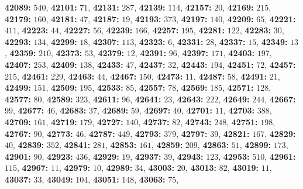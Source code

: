 \textsf{\bfseries 42089:} $540$, \textsf{\bfseries 42101:} $71$, \textsf{\bfseries 42131:} $287$, \textsf{\bfseries 42139:} $114$, \textsf{\bfseries 42157:} $20$, \textsf{\bfseries 42169:} $215$, \textsf{\bfseries 42179:} $160$, \textsf{\bfseries 42181:} $47$, \textsf{\bfseries 42187:} $19$, \textsf{\bfseries 42193:} $373$, \textsf{\bfseries 42197:} $140$, \textsf{\bfseries 42209:} $65$, \textsf{\bfseries 42221:} $411$, \textsf{\bfseries 42223:} $44$, \textsf{\bfseries 42227:} $56$, \textsf{\bfseries 42239:} $166$, \textsf{\bfseries 42257:} $195$, \textsf{\bfseries 42281:} $122$, \textsf{\bfseries 42283:} $30$, \textsf{\bfseries 42293:} $134$, \textsf{\bfseries 42299:} $18$, \textsf{\bfseries 42307:} $113$, \textsf{\bfseries 42323:} $6$, \textsf{\bfseries 42331:} $28$, \textsf{\bfseries 42337:} $15$, \textsf{\bfseries 42349:} $13$, \textsf{\bfseries 42359:} $210$, \textsf{\bfseries 42373:} $53$, \textsf{\bfseries 42379:} $12$, \textsf{\bfseries 42391:} $96$, \textsf{\bfseries 42397:} $171$, \textsf{\bfseries 42403:} $197$, \textsf{\bfseries 42407:} $253$, \textsf{\bfseries 42409:} $138$, \textsf{\bfseries 42433:} $47$, \textsf{\bfseries 42437:} $32$, \textsf{\bfseries 42443:} $194$, \textsf{\bfseries 42451:} $72$, \textsf{\bfseries 42457:} $215$, \textsf{\bfseries 42461:} $229$, \textsf{\bfseries 42463:} $44$, \textsf{\bfseries 42467:} $150$, \textsf{\bfseries 42473:} $11$, \textsf{\bfseries 42487:} $58$, \textsf{\bfseries 42491:} $21$, \textsf{\bfseries 42499:} $151$, \textsf{\bfseries 42509:} $195$, \textsf{\bfseries 42533:} $85$, \textsf{\bfseries 42557:} $78$, \textsf{\bfseries 42569:} $185$, \textsf{\bfseries 42571:} $128$, \textsf{\bfseries 42577:} $80$, \textsf{\bfseries 42589:} $323$, \textsf{\bfseries 42611:} $96$, \textsf{\bfseries 42641:} $23$, \textsf{\bfseries 42643:} $222$, \textsf{\bfseries 42649:} $244$, \textsf{\bfseries 42667:} $99$, \textsf{\bfseries 42677:} $46$, \textsf{\bfseries 42683:} $37$, \textsf{\bfseries 42689:} $59$, \textsf{\bfseries 42697:} $40$, \textsf{\bfseries 42701:} $11$, \textsf{\bfseries 42703:} $388$, \textsf{\bfseries 42709:} $161$, \textsf{\bfseries 42719:} $179$, \textsf{\bfseries 42727:} $140$, \textsf{\bfseries 42737:} $82$, \textsf{\bfseries 42743:} $248$, \textsf{\bfseries 42751:} $198$, \textsf{\bfseries 42767:} $90$, \textsf{\bfseries 42773:} $46$, \textsf{\bfseries 42787:} $449$, \textsf{\bfseries 42793:} $379$, \textsf{\bfseries 42797:} $39$, \textsf{\bfseries 42821:} $167$, \textsf{\bfseries 42829:} $40$, \textsf{\bfseries 42839:} $352$, \textsf{\bfseries 42841:} $281$, \textsf{\bfseries 42853:} $161$, \textsf{\bfseries 42859:} $209$, \textsf{\bfseries 42863:} $51$, \textsf{\bfseries 42899:} $173$, \textsf{\bfseries 42901:} $90$, \textsf{\bfseries 42923:} $436$, \textsf{\bfseries 42929:} $19$, \textsf{\bfseries 42937:} $39$, \textsf{\bfseries 42943:} $123$, \textsf{\bfseries 42953:} $510$, \textsf{\bfseries 42961:} $115$, \textsf{\bfseries 42967:} $11$, \textsf{\bfseries 42979:} $10$, \textsf{\bfseries 42989:} $34$, \textsf{\bfseries 43003:} $20$, \textsf{\bfseries 43013:} $82$, \textsf{\bfseries 43019:} $11$, \textsf{\bfseries 43037:} $33$, \textsf{\bfseries 43049:} $104$, \textsf{\bfseries 43051:} $148$, \textsf{\bfseries 43063:} $75$, 
